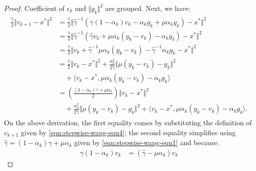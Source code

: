 \documentclass[12pt]{article}
\begin{document}
\begin{proof}
        Coefficient of $\epsilon_k$ and $\Vert g_k\Vert^2$ are grouped. 
        Next, we have: 
        \begin{align}
        \label{eqn:stepwise-lya-proof-eqn2}
        \begin{split}
            \frac{\hat \gamma}{2}\Vert v_{k + 1} - x^* \Vert^2
            &= 
            \frac{\hat \gamma}{2}\Vert 
                \hat \gamma^{-1}
                (
                    \gamma(1 - \alpha_k)v_k - 
                    \alpha_k g_k + \mu \alpha_k y_k
                )
                - x^* 
            \Vert^2
            \\
            &=  
            \frac{\hat \gamma}{2}
            \Vert 
                \hat \gamma^{-1}
                (
                \hat \gamma v_k + \mu \alpha_k(y_k - v_k)
                    - \alpha_k g_k
                )
                - x^* 
            \Vert^2
            \\
            &= 
            \frac{\hat \gamma}{2}
            \Vert 
                v_k + \hat \gamma^{-1} \mu \alpha_k (y_k - v_k)
                - \hat \gamma^{-1}\alpha_k g_k
                - x^* 
            \Vert^2
            \\
            &= 
            \frac{\hat \gamma}{2}
            \Vert v_k - x^*\Vert^2 
            + 
            \frac{\alpha_k^2}{2\hat \gamma}\Vert \mu(y_k - v_k) - g_k\Vert^2 
            \\ &\quad 
                + 
                \langle v_k - x^*, \mu \alpha_k(y_k - v_k) - \alpha_k g_k\rangle
            \\
            &= 
            \left(
            \frac{(1 - \alpha_k)\gamma + \mu \alpha_k}{2} 
            \right)\Vert v_k - x^*\Vert^2
            \\ &\quad
                + 
                \frac{\alpha_k^2}{2\hat \gamma}
                \Vert \mu(y_k - v_k) - g_k\Vert^2 
                + 
                \langle v_k - x^*, \mu \alpha_k(y_k - v_k) - \alpha_k g_k\rangle. 
        \end{split}
        \end{align}
        On the above derivation, the first equality comes by substituting the definition of $v_{k + 1}$ given by \eqref{eqn:stepwise-wapg-eqn4}; the second equality simplifies using $\hat \gamma = (1 - \alpha_k)\gamma + \mu \alpha_k$ given by \eqref{eqn:stepwise-wapg-eqn1} and  because:
        \begin{align*}
            \gamma(1 - \alpha_k) v_k &= 
            (\hat \gamma  - \mu \alpha_k)v_k

\end{align*}
\end{proof}
\end{document}
